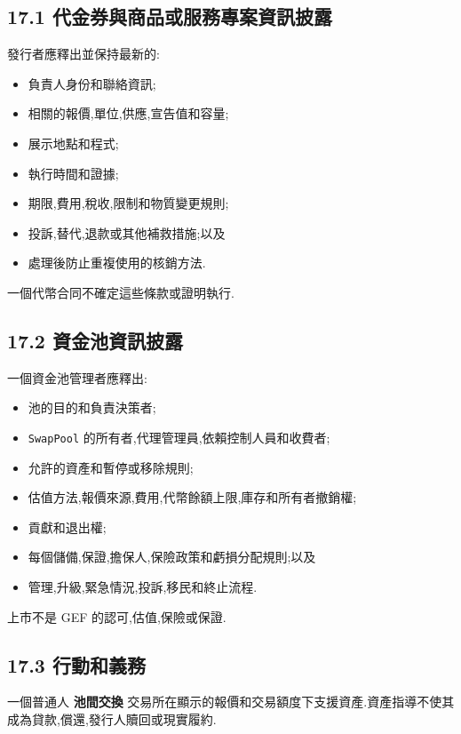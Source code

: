 \documentclass[11pt]{article}
\begin{document}
\subsection*{17.1 代金券與商品或服務專案資訊披露}

發行者應釋出並保持最新的:

\begin{itemize}[leftmargin=*]
\item 負責人身份和聯絡資訊;
\item 相關的報價,單位,供應,宣告值和容量;
\item 展示地點和程式;
\item 執行時間和證據;
\item 期限,費用,稅收,限制和物質變更規則;
\item 投訴,替代,退款或其他補救措施;以及
\item 處理後防止重複使用的核銷方法.
\end{itemize}
一個代幣合同不確定這些條款或證明執行.

\subsection*{17.2 資金池資訊披露}

一個資金池管理者應釋出:

\begin{itemize}[leftmargin=*]
\item 池的目的和負責決策者;
\item \texttt{SwapPool} 的所有者,代理管理員,依賴控制人員和收費者;
\item 允許的資產和暫停或移除規則;
\item 估值方法,報價來源,費用,代幣餘額上限,庫存和所有者撤銷權;
\item 貢獻和退出權;
\item 每個儲備,保證,擔保人,保險政策和虧損分配規則;以及
\item 管理,升級,緊急情況,投訴,移民和終止流程.
\end{itemize}
上市不是 GEF 的認可,估值,保險或保證.

\subsection*{17.3 行動和義務}

一個普通人 \textbf{池間交換} 交易所在顯示的報價和交易額度下支援資產.資產指導不使其成為貸款,償還,發行人贖回或現實履約.
\end{document}
